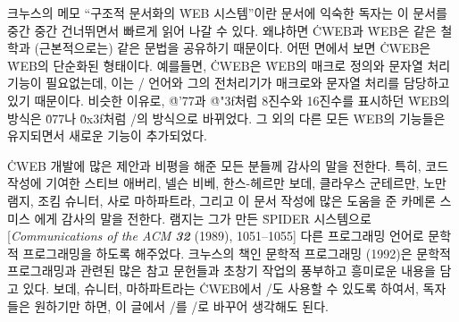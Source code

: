 크누스의 메모 ``구조적 문서화의 \.{WEB} 시스템''이란 문서에 익숙한 독자는 이
문서를 중간 중간 건너뛰면서 빠르게 읽어 나갈 수 있다. 왜냐하면  \.{CWEB}과
\.{WEB}은 같은 철학과 (근본적으로는) 같은 문법을 공유하기 때문이다. 어떤 면에서
보면 \.{CWEB}은 \.{WEB}의 단순화된 형태이다. 예를들면, \.{CWEB}은 \.{WEB}의
매크로 정의와 문자열 처리 기능이 필요없는데, 이는 \CEE/ 언어와 그의 전처리기가
매크로와 문자열 처리를 담당하고 있기 때문이다.
비슷한 이유로, \.{@'77}과 \.{@"3f}처럼 8진수와 16진수를 표시하던  \.{WEB}의 방식은
\.{077}나 \.{0x3f}처럼 \CEE/의 방식으로 바뀌었다.
그 외의 다른 모든 \.{WEB}의 기능들은 유지되면서 새로운 기능이 추가되었다.

\.{CWEB} 개발에 많은 제안과 비평을 해준 모든 분들께 감사의 말을 전한다. 특히, 코드 작성에
기여한 스티브 애버리, 넬슨 비베, 한스-헤르만 보데, 클라우스 군테르만, 노만 램지, 조킴 슈니터,
사로 마하파트라, 그리고 이 문서 작성에 많은 도움을 준 카메론 스미스 에게 감사의 말을 전한다.
램지는 그가 만든 \.{SPIDER} 시스템으로 [{\sl Communications of the ACM\/ \bf32}
(1989), 1051--1055] 다른 프로그래밍 언어로 문학적 프로그래밍을 하도록 해주었다. 크누스의
책인 {\ninesn 문학적 프로그래밍\/} (1992)은 문학적 프로그래밍과 관련된 많은
참고 문헌들과 초창기 작업의 풍부하고 흥미로운 내용을 담고 있다. 보데, 슈니터, 마하파트라는
\.{CWEB}에서 \CPLUSPLUS/도 사용할 수 있도록 하여서, 독자들은 원하기만 하면, 이 글에서
\CEE/를 \CPLUSPLUS/로 바꾸어 생각해도 된다.

